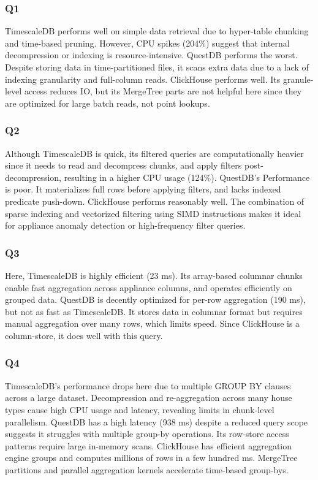\documentclass[conference]{IEEEtran}
\begin{document}
\subsubsection{Q1}
TimescaleDB performs well on simple data retrieval due to hyper-table chunking and time-based pruning. However, CPU spikes (204\%) suggest that internal decompression or indexing is resource-intensive.
QuestDB performs the worst. Despite storing data in time-partitioned files, it scans extra data due to a lack of indexing granularity and full-column reads.
ClickHouse performs well. Its granule-level access reduces IO, but its MergeTree parts are not helpful here since they are optimized for large batch reads, not point lookups.

\subsubsection{Q2}

Although TimescaleDB is quick, its filtered queries are computationally heavier since it needs to read and decompress chunks, and apply filters post-decompression, resulting in a higher CPU usage (124\%).
QuestDB's Performance is poor. It materializes full rows before applying filters, and lacks indexed predicate push-down.
ClickHouse performs reasonably well. The combination of sparse indexing and vectorized filtering using SIMD instructions makes it ideal for appliance anomaly detection or high-frequency filter queries.

\subsubsection{Q3}
Here, TimescaleDB is highly efficient (23 ms). Its array-based columnar chunks enable fast aggregation across appliance columns, and operates efficiently on grouped data.
QuestDB is decently optimized for per-row aggregation (190 ms), but not as fast as TimescaleDB\@. It stores data in columnar format but requires manual aggregation over many rows, which limits speed.
Since ClickHouse is a column-store, it does well with this query.

\subsubsection{Q4}
TimescaleDB's performance drops here due to multiple GROUP BY clauses across a large dataset. Decompression and re-aggregation across many house types cause high CPU usage and latency, revealing limits in chunk-level parallelism.
QuestDB has a high latency (938 ms) despite a reduced query scope suggests it struggles with multiple group-by operations. Its row-store access patterns require large in-memory scans.
ClickHouse has efficient aggregation engine groups and computes millions of rows in a few hundred ms. MergeTree partitions and parallel aggregation kernels accelerate time-based group-bys.
\end{document}
